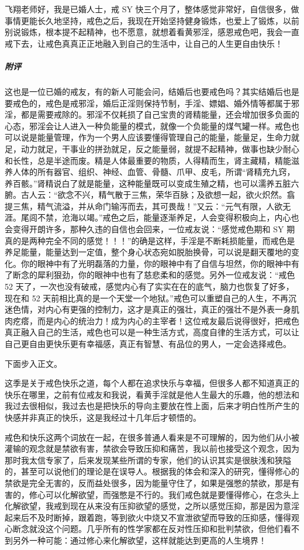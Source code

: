 \begin{case}
    飞翔老师好，我是已婚人士，戒 SY 快三个月了，整体感觉非常好，自信很多，做事情更能长久地坚持，戒色之后，我现在开始坚持健身锻炼，也爱上了锻炼，以前别说锻炼，根本提不起精神，也不愿意，就想着看黄邪淫，感恩戒色吧，我会一直戒下去，让戒色真真正正地融入到自己的生活中，让自己的人生更自由快乐！
    \subparagraph{附评} 这也是一位已婚的戒友，有的新人可能会问，结婚后也要戒色吗？其实结婚后也是要戒色的，戒色是戒邪淫，婚后正淫则保持节制，手淫、嫖娼、婚外情等都属于邪淫，都是需要戒除的。邪淫不仅耗损了自己宝贵的肾精能量，还会增加很多负面的心态，邪淫会让人进入一种负能量的模式，就像一个负能量的煤气罐一样。戒色也可以说是能量管理，作为一个男人应该要懂得管理自己的能量，能量足，生命力就足，动力就足，干事业的拼劲就足，反之能量弱，就提不起精神，做事也缺少耐心和长性，总是半途而废。精是人体最重要的物质，人得精而生，肾主藏精，精能滋养人体的所有器官、组织、神经、血管、骨髓、爪甲、皮毛，所谓“肾精充九窍，养百骸。”肾精说白了就是能量，这种能量既可以变成生殖之精，也可以濡养五脏六腑。古人云：“欲念不兴，精气散于三焦，荣华百脉；及欲想一起，欲火炽然。翕提三焦，精气流溢，并从命门输泻而去，其可畏哉！”又云：“元气有限，人欲无涯。尾闾不禁，沧海以竭。”戒色之后，能量逐渐养足，人会变得积极向上，内心也会变得开朗许多，那种久违的自信也会回来，一位戒友说：“感觉戒色期和 SY 期真的是两种完全不同的感觉！！！”的确是这样，手淫是不断耗损能量，而戒色是养足能量，能量达到一定值，整个身心状态宛如脱胎换骨，可以说是翻天覆地的变化。你的眼神中有了光明磊落的力量，你的眼神中有了自信与坦然，你的眼神中有了断念的犀利狠劲，你的眼神中也有了慈悲柔和的感觉。另外一位戒友说：“戒色 52 天了，一次也没有破戒，感觉内心有了实实在在的底气，脑力也恢复了好多，现在和 52 天前相比真的是一个天堂一个地狱。”戒色可以重塑自己的人生，不再沉迷色情，对内心有更强的控制力，这才是真正的强壮，真正的强壮不是外表一身肌肉疙瘩，而是内心的统治力！成为内心的主宰者！这位戒友最后说得很好，把戒色真正融入自己的生活，戒色也可以是一种生活方式，高度自律的生活方式，可以让自己更自由更快乐更有幸福感，真正有智慧、有品位的男人，一定会选择戒色。
\end{case}

下面步入正文。

这季是关于戒色快乐之道，每个人都在追求快乐与幸福，但很多人都不知道真正的快乐在哪里，之前有位戒友和我说，看黄手淫就是他人生最大的乐趣，他的想法和我过去很相似，我过去也是把快乐的导向主要放在性上面，后来才明白性所产生的快感并非真正的快乐，这是我经过十几年后才顿悟的。

戒色和快乐这两个词放在一起，在很多普通人看来是不可理解的，因为他们从小被灌输的观念就是禁欲有害，禁欲会导致压抑和痛苦，我以前也接受这个观念，因为那时我太信专家了，后来发现某些所谓的专家，他们的认识其实是很肤浅和狭隘的，甚至可以说他们的理论是在误导人。根据我的体会和深入的研究，懂得修心的禁欲是完全无害的，反而益处很多，因为能量守住了，如果是强憋的禁欲，那是有害的，修心可以化解欲望，而强憋是不行的。我们戒色就是要懂得修心，在念头上化解欲望，我戒到现在从来没有压抑欲望的感觉，之所以感觉压抑，那是因为意淫起来后不及时断掉，跟着跑，等到欲火中烧又不宣泄欲望而导致的压抑感，懂得观心断念就没这个问题。几乎所有的性学家都在反对性压抑和批判禁欲，但他们看不到另外一种可能：通过修心来化解欲望，这样就能达到更高的人生境界！

